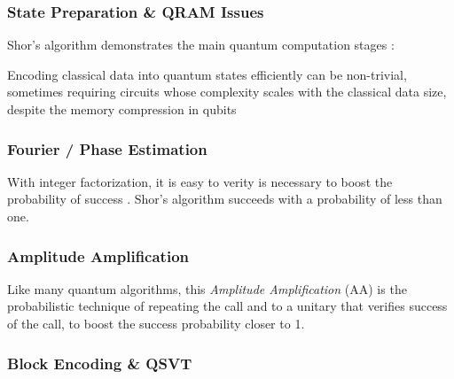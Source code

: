 \subsubsection{State Preparation \& QRAM Issues}

Shor's algorithm demonstrates the main quantum computation stages \cite{Nielsen:2010}:

Encoding classical data into quantum states efficiently can be non-trivial, 
sometimes requiring circuits whose complexity scales with the classical data size, despite the memory compression in qubits

\subsubsection{Fourier / Phase Estimation}

With integer factorization, it is easy to verity is necessary to boost the probability of success \cite{Lipton:2021}.
Shor's algorithm succeeds with a probability of less than one.


\subsubsection{Amplitude Amplification}

Like many quantum algorithms, this 
\emph{Amplitude Amplification} (AA) \cite{Dalzell:2023} is the probabilistic technique of 
repeating the call and to a unitary that verifies success of the call, to boost the success probability
closer to 1.






\subsubsection{Block Encoding \& QSVT}

